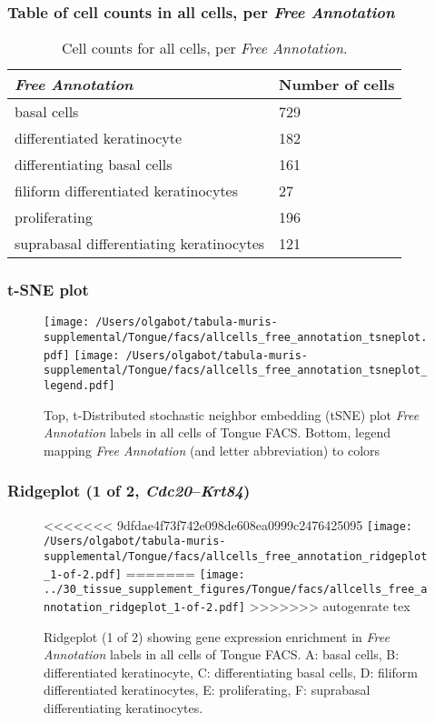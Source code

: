\subsubsection{Table of cell counts in all cells, per \emph{Free Annotation}}\begin{table}[h]
\centering
\label{my-label}
\begin{tabular}{@{}ll@{}}
\toprule

\emph{Free Annotation}& Number of cells \\ \midrule
basal cells & 729 \\

differentiated keratinocyte & 182 \\

differentiating basal cells & 161 \\

filiform differentiated keratinocytes & 27 \\

proliferating & 196 \\

suprabasal differentiating keratinocytes & 121 \\
\bottomrule
\end{tabular}
\caption{Cell counts for all cells, per \emph{Free Annotation}.}
\end{table}

\clearpage
\subsubsection{t-SNE plot}
\begin{figure}[h]
\centering
\texttt{[image: /Users/olgabot/tabula-muris-supplemental/Tongue/facs/allcells\_free\_annotation\_tsneplot.pdf]}
\texttt{[image: /Users/olgabot/tabula-muris-supplemental/Tongue/facs/allcells\_free\_annotation\_tsneplot\_legend.pdf]}
\caption{Top, t-Distributed stochastic neighbor embedding (tSNE) plot  \emph{Free Annotation} labels in all cells of Tongue FACS. Bottom, legend mapping \emph{Free Annotation} (and letter abbreviation) to colors}
\end{figure}


\clearpage

\subsubsection{Ridgeplot (1 of 2, \emph{Cdc20}--\emph{Krt84})}
\begin{figure}[h]
\centering
<<<<<<< 9dfdae4f73f742e098de608ea0999c2476425095
\texttt{[image: /Users/olgabot/tabula-muris-supplemental/Tongue/facs/allcells\_free\_annotation\_ridgeplot\_1-of-2.pdf]}
=======
\texttt{[image: ../30\_tissue\_supplement\_figures/Tongue/facs/allcells\_free\_annotation\_ridgeplot\_1-of-2.pdf]}
>>>>>>> autogenrate tex

\caption{ Ridgeplot (1 of 2)  showing gene expression enrichment in \emph{Free Annotation} labels in all cells of Tongue FACS. A: basal cells, B: differentiated keratinocyte, C: differentiating basal cells, D: filiform differentiated keratinocytes, E: proliferating, F: suprabasal differentiating keratinocytes.}
\end{figure}


